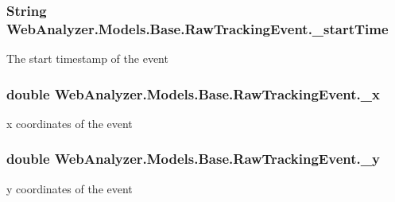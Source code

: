 \subsubsection[{\+\_\+start\+Time}]{\setlength{\rightskip}{0pt plus 5cm}String Web\+Analyzer.\+Models.\+Base.\+Raw\+Tracking\+Event.\+\_\+start\+Time\hspace{0.3cm}{\ttfamily [private]}}\label{class_web_analyzer_1_1_models_1_1_base_1_1_raw_tracking_event_a72306d985d302cae91cdf57ee9db667d}


The start timestamp of the event 

\hypertarget{class_web_analyzer_1_1_models_1_1_base_1_1_raw_tracking_event_a10d86c244a5c86ec2f1c29518a4db4b7}{}
\subsubsection[{\+\_\+x}]{\setlength{\rightskip}{0pt plus 5cm}double Web\+Analyzer.\+Models.\+Base.\+Raw\+Tracking\+Event.\+\_\+x\hspace{0.3cm}{\ttfamily [private]}}\label{class_web_analyzer_1_1_models_1_1_base_1_1_raw_tracking_event_a10d86c244a5c86ec2f1c29518a4db4b7}


x coordinates of the event 

\hypertarget{class_web_analyzer_1_1_models_1_1_base_1_1_raw_tracking_event_a3c6afdca9f26e3549fbc847df3f5aab7}{}
\subsubsection[{\+\_\+y}]{\setlength{\rightskip}{0pt plus 5cm}double Web\+Analyzer.\+Models.\+Base.\+Raw\+Tracking\+Event.\+\_\+y\hspace{0.3cm}{\ttfamily [private]}}\label{class_web_analyzer_1_1_models_1_1_base_1_1_raw_tracking_event_a3c6afdca9f26e3549fbc847df3f5aab7}


y coordinates of the event 



